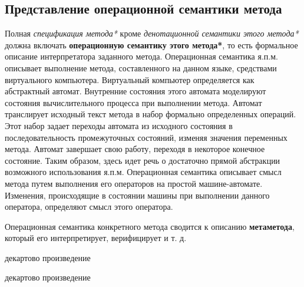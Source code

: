 \subsection{Представление операционной семантики метода}

Полная \textit{спецификация метода*} кроме \textit{денотационной семантики этого метода*} должна включать \textbf{операционную семантику этого метода*}, то есть формальное описание интерпретатора заданного метода. Операционная семантика я.п.м. описывает выполнение метода, составленного на данном языке, средствами виртуального компьютера. Виртуальный компьютер определяется как абстрактный автомат. Внутренние состояния этого автомата моделируют состояния вычислительного процесса при выполнении метода. Автомат транслирует исходный текст метода в набор формально определенных операций. Этот набор задает переходы автомата из исходного состояния в последовательность промежуточных состояний, изменяя значения переменных метода. Автомат завершает свою работу, переходя в некоторое конечное состояние. Таким образом, здесь идет речь о достаточно прямой абстракции возможного использования я.п.м. Операционная семантика описывает смысл метода путем выполнения его операторов на простой машине-автомате. Изменения, происходящие в состоянии машины при выполнении данного оператора, определяют смысл этого оператора.

Операционная семантика конкретного метода сводится к описанию \textbf{метаметода}, который его интерпретирует, верифицирует и т. д.

\begin{SCn}
\end{SCn}

\begin{SCn}
\begin{scnindent}
    \begin{scnreltovector}{декартово произведение}
    \end{scnreltovector}
\end{scnindent}
\begin{scnindent}
    \begin{scnreltovector}{декартово произведение}
    \end{scnreltovector}
\end{scnindent}
\end{SCn}

